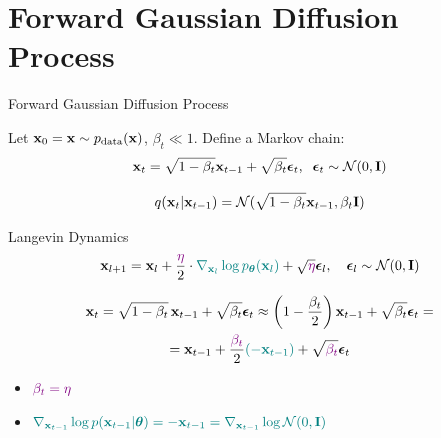 \documentclass{beamer}
\renewcommand{\eqpause}{}
\begin{document}
\section{Forward Gaussian Diffusion Process}
\begin{frame}{Forward Gaussian Diffusion Process}

	Let $\mathbf{x}_0 = \mathbf{x} \sim p_{\text{data}}(\mathbf{x})$, $\beta_t \ll 1$. Define a Markov chain:
	\[
		\mathbf{x}_t = \sqrt{1 - \beta_t} \mathbf{x}_{t-1} + \sqrt{\beta_t} \boldsymbol{\epsilon}_t, \;\; \boldsymbol{\epsilon}_t \sim \mathcal{N}(0, \mathbf{I})
	\]
	\vspace{-0.5cm}
    \eqpause
	\[
		q(\mathbf{x}_t | \mathbf{x}_{t-1}) = \mathcal{N}(\sqrt{1 - \beta_t} \mathbf{x}_{t-1}, \beta_t \mathbf{I})
	\]
    \eqpause
	\vspace{-0.5cm}
	\begin{block}{Langevin Dynamics}
		\vspace{-0.3cm}
		\[
			\mathbf{x}_{l + 1} = \mathbf{x}_l + \frac{ \color{violet} \eta}{2} \cdot {\color{teal}\nabla_{\mathbf{x}_l} \log p_{\boldsymbol{\theta}}(\mathbf{x}_l)} + \sqrt{ \color{violet} \eta} \boldsymbol{\epsilon}_l, \quad \boldsymbol{\epsilon}_l \sim \mathcal{N}(0, \mathbf{I})
		\]
		\vspace{-0.5cm}
	\end{block}
    \eqpause
	\vspace{-0.7cm}
	\begin{multline*}
		\mathbf{x}_t = \sqrt{1 - \beta_t}\, \mathbf{x}_{t - 1} + \sqrt{\beta_t} \boldsymbol{\epsilon}_t \approx \left(1 - \frac{\beta_t}{2}\right)\mathbf{x}_{t-1} + \sqrt{\beta_t} \boldsymbol{\epsilon}_t = \\
		= \mathbf{x}_{t-1} + \frac{ \color{violet}  \beta_t}{2} {\color{teal} ( -\mathbf{x}_{t-1} )} + \sqrt{ \color{violet}  \beta_t} \boldsymbol{\epsilon}_t
	\end{multline*}
    \eqpause
	\vspace{-0.7cm}
	\begin{itemize}
		\item ${\color{violet} \beta_t = \eta }$
		\item ${\color{teal} \nabla_{\mathbf{x}_{t-1}}\log p(\mathbf{x}_{t-1} | \boldsymbol{\theta}) = - \mathbf{x}_{t-1} = \nabla_{\mathbf{x}_{t-1}} \log \mathcal{N}(0, \mathbf{I})}$
	\end{itemize}
 \end{frame}
\end{document}
